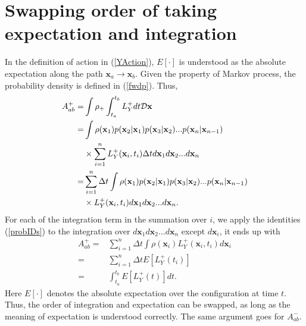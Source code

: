 \documentclass[%
 aip, 
 amsmath,amssymb,amsthm,
 nofootinbib,
 reprint,
]{revtex4-1}
\begin{document}
\section{Swapping order of taking expectation and integration}
\label{AppendixB}
In the definition of action in (\ref{YAction}), $E[\cdot]$ is understood as the absolute expectation along the path $\mathbf{x}_a \to \mathbf{x}_b$. Given the property of Markov process, the probability density is defined in (\ref{fwdp}). Thus,
\begin{equation}
    \label{B1}
    \begin{split}
        A^+_{ab} =& \int \rho_+ \int_{t_a}^{t_b} L_Y^+dt \cal{D}\mathbf{x} \\
        =& \int \rho(\mathbf{x}_1)p(\mathbf{x}_2|\mathbf{x}_1)p(\mathbf{x}_3|\mathbf{x}_2)...p(\mathbf{x}_n|\mathbf{x}_{n-1})\\
        &\times \sum^n_{i=1}L_Y^+(\mathbf{x}_i, t_i)\Delta t d\mathbf{x}_1d\mathbf{x}_2...d\mathbf{x}_n \\
        =&\sum^n_{i=1}\Delta t \int \rho(\mathbf{x}_1)p(\mathbf{x}_2|\mathbf{x}_1)p(\mathbf{x}_3|\mathbf{x}_2)...p(\mathbf{x}_n|\mathbf{x}_{n-1}) \\
        &\times L_Y^+(\mathbf{x}_i, t_i) d\mathbf{x}_1d\mathbf{x}_2...d\mathbf{x}_n.
    \end{split}
\end{equation}
For each of the integration term in the summation over $i$, we apply the identities (\ref{probIDs}) to the integration over $d\mathbf{x}_1d\mathbf{x}_2...d\mathbf{x}_n$ except $d\mathbf{x}_i$, it ends up with
\begin{equation}
    \label{B2}
    \begin{split}
    A^+_{ab} =& \sum^n_{i=1}\Delta t \int \rho(\mathbf{x}_i) L_Y^+(\mathbf{x}_i, t_i)d\mathbf{x}_i \\
    =&\sum^n_{i=1}\Delta t E[L^+_Y (t_i)]\\
    =&\int_{t_a}^{t_b} E[L^+_Y(t)] dt.
    \end{split}
\end{equation}
Here $E[\cdot]$ denotes the absolute expectation over the configuration at time $t$. Thus, the order of integration and expectation can be swapped, as long as the meaning of expectation is understood correctly. The same argument goes for $A_{ab}^-$.
\end{document}
